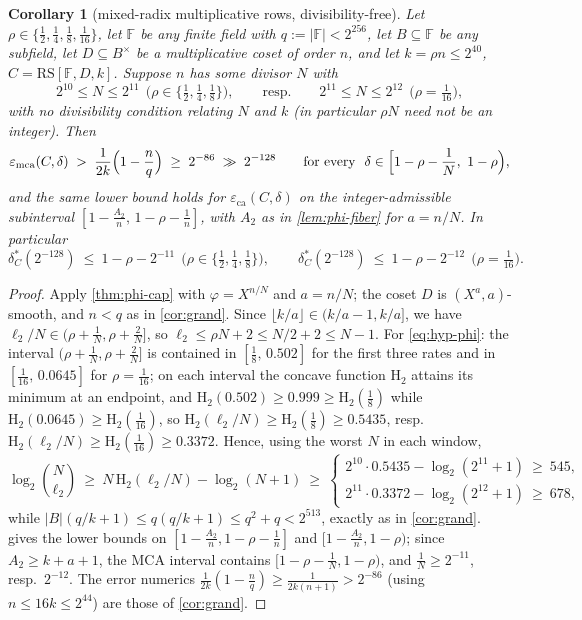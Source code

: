 \documentclass[11pt]{article}
\newtheorem{corollary}[theorem]{Corollary}
\theoremstyle{definition}
\theoremstyle{remark}
\newcommand{\F}{\mathbb{F}}
\newcommand{\B}{B}
\newcommand{\RS}{\mathrm{RS}}
\newcommand{\eca}{\varepsilon_{\mathrm{ca}}}
\newcommand{\emca}{\varepsilon_{\mathrm{mca}}}
\newcommand{\Hb}{\mathrm{H}_2}
\begin{document}
\begin{corollary}[mixed-radix multiplicative rows, divisibility-free]\label{cor:mixed-radix}
Let $\rho\in\{\frac12,\frac14,\frac18,\frac1{16}\}$, let $\F$ be any finite field with $q:=|\F|<2^{256}$, let $\B\subseteq\F$ be any subfield, let $D\subseteq\B^\times$ be a multiplicative coset of order $n$, and let $k=\rho n\le2^{40}$, $C=\RS[\F,D,k]$. Suppose $n$ has \emph{some} divisor $N$ with
\[
2^{10}\le N\le2^{11}\ \ \bigl(\rho\in\{\tfrac12,\tfrac14,\tfrac18\}\bigr),
\qquad\text{resp.}\qquad
2^{11}\le N\le2^{12}\ \ \bigl(\rho=\tfrac1{16}\bigr),
\]
with no divisibility condition relating $N$ and $k$ \textup(in particular $\rho N$ need not be an integer\textup). Then
\[
\emca(C,\delta)\;>\;\frac1{2k}\Bigl(1-\frac nq\Bigr)\;\ge\;2^{-86}\;\gg\;2^{-128}
\qquad\text{for every }\ \delta\in\Bigl[1-\rho-\frac1N,\ 1-\rho\Bigr),
\]
and the same lower bound holds for $\eca(C,\delta)$ on the integer-admissible subinterval $[1-\frac{A_2}n,\,1-\rho-\frac1n]$, with $A_2$ as in \cref{lem:phi-fiber} for $a=n/N$. In particular
\[
\delta^*_C(2^{-128})\ \le\ 1-\rho-2^{-11}\ \ \bigl(\rho\in\{\tfrac12,\tfrac14,\tfrac18\}\bigr),
\qquad
\delta^*_C(2^{-128})\ \le\ 1-\rho-2^{-12}\ \ \bigl(\rho=\tfrac1{16}\bigr).
\]
\end{corollary}

\begin{proof}
Apply \cref{thm:phi-cap} with $\varphi=X^{n/N}$ and $a=n/N$; the coset $D$ is $(X^a,a)$-smooth, and $n<q$ as in \cref{cor:grand}. Since $\lfloor k/a\rfloor\in(k/a-1,k/a]$, we have $\ell_2/N\in(\rho+\frac1N,\rho+\frac2N]$, so $\ell_2\le\rho N+2\le N/2+2\le N-1$. For \eqref{eq:hyp-phi}: the interval $(\rho+\frac1N,\rho+\frac2N]$ is contained in $[\frac18,\,0.502]$ for the first three rates and in $[\frac1{16},\,0.0645]$ for $\rho=\frac1{16}$; on each interval the concave function $\Hb$ attains its minimum at an endpoint, and $\Hb(0.502)\ge0.999\ge\Hb(\frac18)$ while $\Hb(0.0645)\ge\Hb(\frac1{16})$, so $\Hb(\ell_2/N)\ge\Hb(\frac18)\ge0.5435$, resp.\ $\Hb(\ell_2/N)\ge\Hb(\frac1{16})\ge0.3372$. Hence, using the worst $N$ in each window,
\[
\log_2\binom N{\ell_2}\ \ge\ N\,\Hb(\ell_2/N)-\log_2(N+1)\ \ge\
\begin{cases}
2^{10}\cdot0.5435-\log_2(2^{11}+1)\ \ge\ 545,\\[2pt]
2^{11}\cdot0.3372-\log_2(2^{12}+1)\ \ge\ 678,
\end{cases}
\]
while $|\B|(q/k+1)\le q(q/k+1)\le q^2+q<2^{513}$, exactly as in \cref{cor:grand}.  gives the lower bounds on $[1-\frac{A_2}n,1-\rho-\frac1n]$ and $[1-\frac{A_2}n,1-\rho)$; since $A_2\ge k+a+1$, the MCA interval contains $[1-\rho-\frac1N,1-\rho)$, and $\frac1N\ge2^{-11}$, resp.\ $2^{-12}$. The error numerics $\frac1{2k}(1-\frac nq)\ge\frac1{2k(n+1)}>2^{-86}$ (using $n\le16k\le2^{44}$) are those of \cref{cor:grand}.
\end{proof}
\end{document}

